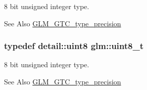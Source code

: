 8 bit unsigned integer type. 

\begin{DoxySeeAlso}{See Also}
\hyperlink{group__gtc__type__precision}{G\-L\-M\-\_\-\-G\-T\-C\-\_\-type\-\_\-precision} 
\end{DoxySeeAlso}
\hypertarget{group__gtc__type__precision_ga93adf6dd9803408f3e3aaf9dedda352b}{
\subsubsection[{uint8\-\_\-t}]{\setlength{\rightskip}{0pt plus 5cm}typedef detail\-::uint8 {\bf glm\-::uint8\-\_\-t}}}\label{group__gtc__type__precision_ga93adf6dd9803408f3e3aaf9dedda352b}


8 bit unsigned integer type. 

\begin{DoxySeeAlso}{See Also}
\hyperlink{group__gtc__type__precision}{G\-L\-M\-\_\-\-G\-T\-C\-\_\-type\-\_\-precision} 
\end{DoxySeeAlso}
